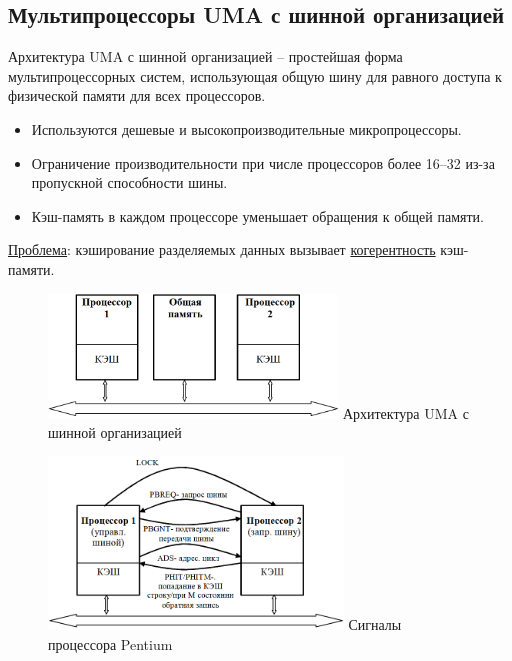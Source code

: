 	\subsection{Мультипроцессоры UMA с шинной организацией}
	\vspace{-0.5em}
	Архитектура UMA с шинной организацией -- простейшая форма мультипроцессорных систем,
	\newline
	использующая общую шину для равного доступа к физической памяти для всех процессоров.
	\begin{itemize}
		\item Используются дешевые и высокопроизводительные микропроцессоры.
		\item Ограничение производительности при числе процессоров более 16–32 из-за пропускной 
		\newline
		способности шины.
		\item Кэш-память в каждом процессоре уменьшает обращения к общей памяти.
	\end{itemize}
	\uline{Проблема}: кэширование разделяемых данных вызывает \uline{когерентность} кэш-памяти.
	\vspace{-1em}
	\begin{figure}[H]
		\centering
		\begin{minipage}[t]{0.49\textwidth}
			\centering
			\includegraphics[width=\linewidth,height=3.3cm,keepaspectratio=false]{img/02_05}
			{\small Архитектура UMA с шинной организацией}
			\label{fig:02_05}
		\end{minipage}
		\hfill
		\begin{minipage}[t]{0.49\textwidth}
			\centering
			\includegraphics[width=\linewidth,height=4.6cm,keepaspectratio=false]{img/02_06}
			{\small Сигналы процессора Pentium}
			\label{fig:02_06}
		\end{minipage}
		\vspace{-1.5em}
	\end{figure}
	
